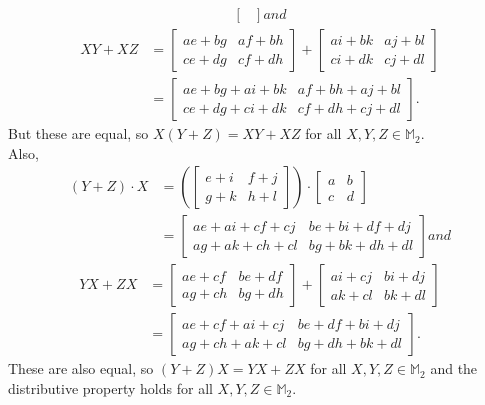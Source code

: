 \begin{enumerate}[(a)]
\begin{enumerate}[(1)]
\begin{align*}
\begin{bmatrix}
\end{bmatrix} and
\end{align*}
\begin{align*}
XY+XZ&=
\begin{bmatrix}
ae+bg & af+bh\\
ce+dg & cf+dh
\end{bmatrix}+
\begin{bmatrix}
ai+bk & aj+bl\\
ci+dk & cj+dl
\end{bmatrix}\\
&=
\begin{bmatrix}
ae+bg+ai+bk & af+bh+aj+bl\\
ce+dg+ci+dk & cf+dh+cj+dl
\end{bmatrix}.
\end{align*}
But these are equal, so $X(Y+Z)=XY+XZ$ for all $X,Y,Z\in{\mathbb M}_2$.\\  
Also,
\begin{align*}
(Y+Z)\cdot X&=\left(
\begin{bmatrix}
e+i & f+j\\
g+k & h+l
\end{bmatrix}
\right)\cdot
\begin{bmatrix}
a & b\\
c & d
\end{bmatrix}\\
&=
\begin{bmatrix}
ae+ai+cf+cj & be+bi+df+dj\\
ag+ak+ch+cl & bg+bk+dh+dl
\end{bmatrix} and
\end{align*}
\begin{align*}
YX+ZX&=
\begin{bmatrix}
ae+cf & be+df\\
ag+ch & bg+dh
\end{bmatrix}+
\begin{bmatrix}
ai+cj & bi+dj\\
ak+cl & bk+dl
\end{bmatrix}\\
&=
\begin{bmatrix}
ae+cf+ai+cj & be+df+bi+dj\\
ag+ch+ak+cl & bg+dh+bk+dl
\end{bmatrix}.
\end{align*}
These are also equal, so $(Y+Z)X=YX+ZX$ for all $X,Y,Z\in{\mathbb M}_2$ and the distributive property holds for all $X,Y,Z\in{\mathbb M}_2$.
\end{enumerate}

\end{enumerate}
